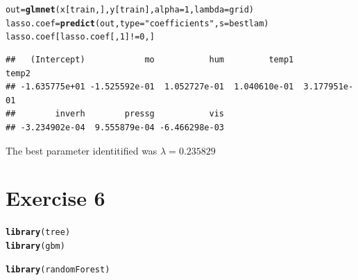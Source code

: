 \documentclass{article}\usepackage[]{graphicx}\usepackage[]{color}
\makeatletter
\newcommand{\hlnum}[1]{\textcolor[rgb]{0.686,0.059,0.569}{#1}}%
\newcommand{\hlstr}[1]{\textcolor[rgb]{0.192,0.494,0.8}{#1}}%
\newcommand{\hlopt}[1]{\textcolor[rgb]{0,0,0}{#1}}%
\newcommand{\hlstd}[1]{\textcolor[rgb]{0.345,0.345,0.345}{#1}}%
\newcommand{\hlkwb}[1]{\textcolor[rgb]{0.69,0.353,0.396}{#1}}%
\newcommand{\hlkwc}[1]{\textcolor[rgb]{0.333,0.667,0.333}{#1}}%
\newcommand{\hlkwd}[1]{\textcolor[rgb]{0.737,0.353,0.396}{\textbf{#1}}}%
\newenvironment{kframe}{%
 \def\at@end@of@kframe{}%
 \ifinner\ifhmode%
  \def\at@end@of@kframe{\end{minipage}}%
  \begin{minipage}{\columnwidth}%
 \fi\fi%
 \def\FrameCommand##1{\hskip\@totalleftmargin \hskip-\fboxsep
 \colorbox{shadecolor}{##1}\hskip-\fboxsep
     \hskip-\linewidth \hskip-\@totalleftmargin \hskip\columnwidth}%
 \MakeFramed {\advance\hsize-\width
   \@totalleftmargin\z@ \linewidth\hsize
   \@setminipage}}%
 {\par\unskip\endMakeFramed%
 \at@end@of@kframe}
\newenvironment{knitrout}{}{} %
\makeatother
\begin{document}
\begin{knitrout}
\begin{kframe}
\begin{alltt}
\hlstd{out}\hlkwb{=}\hlkwd{glmnet}\hlstd{(x[train ,],y[train],}\hlkwc{alpha}\hlstd{=}\hlnum{1}\hlstd{,}\hlkwc{lambda}\hlstd{=grid)}
\hlstd{lasso.coef}\hlkwb{=}\hlkwd{predict}\hlstd{(out,}\hlkwc{type}\hlstd{=}\hlstr{"coefficients"}\hlstd{,}\hlkwc{s}\hlstd{=bestlam)}
\hlstd{lasso.coef[lasso.coef[,}\hlnum{1}\hlstd{]}\hlopt{!=}\hlnum{0}\hlstd{,]}
\end{alltt}
\begin{verbatim}
##   (Intercept)            mo           hum         temp1         temp2 
## -1.635775e+01 -1.525592e-01  1.052727e-01  1.040610e-01  3.177951e-01 
##        inverh        pressg           vis 
## -3.234902e-04  9.555879e-04 -6.466298e-03
\end{verbatim}
\end{kframe}
\end{knitrout}
The best parameter identitified was $\lambda = 0.235829$
\section*{Exercise 6}
\begin{knitrout}
\color{fgcolor}\begin{kframe}
\begin{alltt}
\hlkwd{library}\hlstd{(tree)}
\hlkwd{library}\hlstd{(gbm)}
\end{alltt}


{\ttfamily\noindent\itshape\color{messagecolor}{\#\# Loading required package: survival\\\#\# \\\#\# Attaching package: 'survival'\\\#\# \\\#\# The following object is masked from 'package:boot':\\\#\# \\\#\#\ \ \ \  aml\\\#\# \\\#\# Loading required package: lattice\\\#\# \\\#\# Attaching package: 'lattice'\\\#\# \\\#\# The following object is masked from 'package:boot':\\\#\# \\\#\#\ \ \ \  melanoma\\\#\# \\\#\# Loading required package: parallel\\\#\# Loaded gbm 2.1.1}}\begin{alltt}
\hlkwd{library}\hlstd{(randomForest)}
\end{alltt}


{\ttfamily\noindent\itshape\color{messagecolor}{\#\# randomForest 4.6-12\\\#\# Type rfNews() to see new features/changes/bug fixes.}}\end{kframe}
\end{knitrout}
\end{document}
